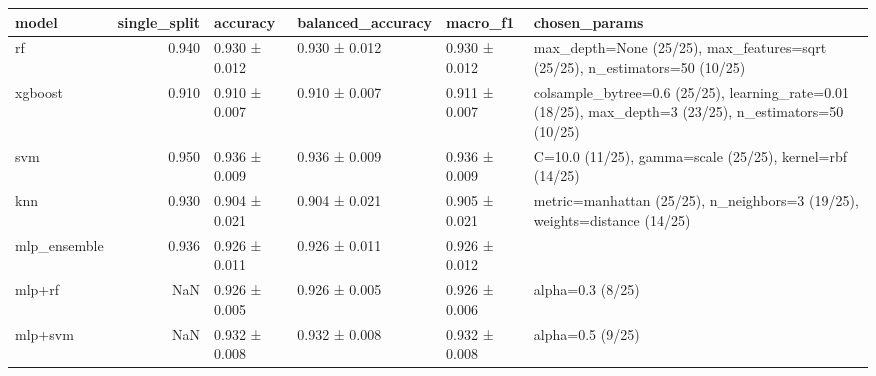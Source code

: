 \begin{tabular}{lrllll}
\toprule
model & single\_split & accuracy & balanced\_accuracy & macro\_f1 & chosen\_params \\
\midrule
rf & 0.940 & 0.930 ± 0.012 & 0.930 ± 0.012 & 0.930 ± 0.012 & max\_depth=None (25/25), max\_features=sqrt (25/25), n\_estimators=50 (10/25) \\
xgboost & 0.910 & 0.910 ± 0.007 & 0.910 ± 0.007 & 0.911 ± 0.007 & colsample\_bytree=0.6 (25/25), learning\_rate=0.01 (18/25), max\_depth=3 (23/25), n\_estimators=50 (10/25) \\
svm & 0.950 & 0.936 ± 0.009 & 0.936 ± 0.009 & 0.936 ± 0.009 & C=10.0 (11/25), gamma=scale (25/25), kernel=rbf (14/25) \\
knn & 0.930 & 0.904 ± 0.021 & 0.904 ± 0.021 & 0.905 ± 0.021 & metric=manhattan (25/25), n\_neighbors=3 (19/25), weights=distance (14/25) \\
mlp\_ensemble & 0.936 & 0.926 ± 0.011 & 0.926 ± 0.011 & 0.926 ± 0.012 &  \\
mlp+rf & NaN & 0.926 ± 0.005 & 0.926 ± 0.005 & 0.926 ± 0.006 & alpha=0.3 (8/25) \\
mlp+svm & NaN & 0.932 ± 0.008 & 0.932 ± 0.008 & 0.932 ± 0.008 & alpha=0.5 (9/25) \\
\bottomrule
\end{tabular}
